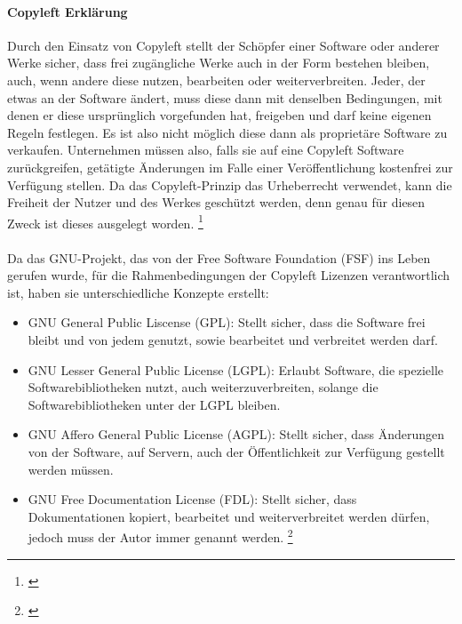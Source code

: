 \documentclass[titlepage,12pt,twoside]{article}
\begin{document}
\paragraph{Copyleft Erklärung}
\hfill \break
\hfill \break
Durch den Einsatz von Copyleft stellt der Schöpfer einer Software oder anderer Werke sicher, dass frei 
zugängliche Werke auch in der Form bestehen bleiben, auch, wenn andere diese nutzen, bearbeiten oder 
weiterverbreiten. Jeder, der etwas an der Software ändert, muss diese dann mit denselben Bedingungen, mit 
denen er diese ursprünglich vorgefunden hat, freigeben und darf keine eigenen Regeln festlegen. Es ist also 
nicht möglich diese dann als proprietäre Software zu verkaufen. Unternehmen müssen also, falls sie auf eine 
Copyleft Software zurückgreifen, getätigte Änderungen im Falle einer Veröffentlichung kostenfrei zur Verfügung 
stellen. Da das Copyleft-Prinzip das Urheberrecht verwendet, kann die Freiheit der Nutzer und des Werkes 
geschützt werden, denn genau für diesen Zweck ist dieses ausgelegt worden. \footnote{\cite{GNU}} \\
\\
Da das GNU-Projekt, das von der Free Software Foundation (FSF) ins Leben gerufen wurde, für die 
Rahmenbedingungen der Copyleft Lizenzen verantwortlich ist, haben sie unterschiedliche Konzepte erstellt: \\ 
\begin{itemize}
	\item GNU General Public Liscense (GPL): Stellt sicher, dass die Software frei bleibt und von jedem 
	genutzt, sowie bearbeitet und verbreitet werden darf.
	\item GNU Lesser General Public License (LGPL): Erlaubt Software, die spezielle Softwarebibliotheken 
	nutzt, auch weiterzuverbreiten, solange die Softwarebibliotheken unter der LGPL bleiben.
	\item GNU Affero General Public License (AGPL): Stellt sicher, dass Änderungen von der Software, auf 
	Servern, auch der Öffentlichkeit zur Verfügung gestellt werden müssen.
	\item GNU Free Documentation License (FDL): Stellt sicher, dass Dokumentationen kopiert, bearbeitet und 
	weiterverbreitet werden dürfen, jedoch muss der Autor immer genannt werden. \footnote{\cite{GNU}}
\end{itemize}
\hfill \break
\end{document}
